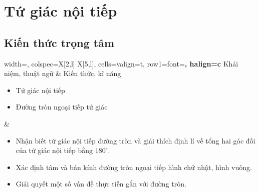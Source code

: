 %

\section{Tứ giác nội tiếp}

\begin{lesson}
    \subsection{Kiến thức trọng tâm}

    \begin{center}
    \begin{tblr}{
        width=\linewidth,
        colspec={X[2,l] X[5,l]},
        cells={valign=t},
        row{1}={font=\bfseries, halign=c}
    }
        Khái niệm, thuật ngữ & Kiến thức, kĩ năng \\
        \begin{minipage}[t]{\linewidth}
        \begin{itemize}
            \item Tứ giác nội tiếp
            \item Đường tròn ngoại tiếp tứ giác
        \end{itemize}
        \end{minipage}
        &
        \begin{minipage}[t]{\linewidth}
        \begin{itemize}
            \item Nhận biết tứ giác nội tiếp đường tròn và giải thích định lí về tổng hai góc đối của tứ giác nội tiếp bằng $180^\circ$.
            \item Xác định tâm và bán kính đường tròn ngoại tiếp hình chữ nhật, hình vuông.
            \item Giải quyết một số vấn đề thực tiễn gắn với đường tròn.
        \end{itemize}
        \end{minipage}
    \end{tblr}
    \end{center}


\end{lesson}
